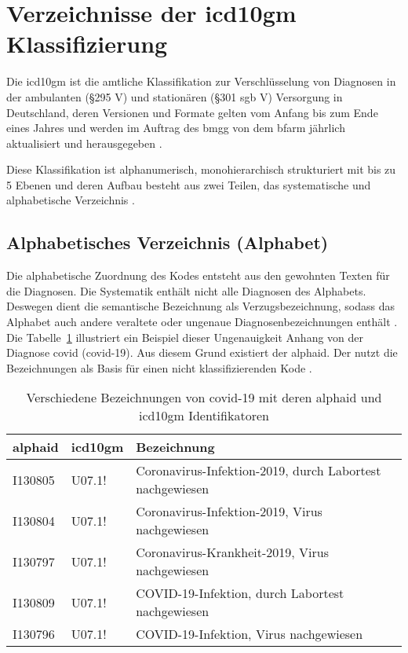 \section{Verzeichnisse der \acs{icd10gm} Klassifizierung} \label{sec:difclass}

Die \ac{icd10gm} ist die amtliche Klassifikation zur Verschlüsselung von Diagnosen in der ambulanten (\S 295  V) und stationären (\S 301 \ac{sgb} V) Versorgung in Deutschland, deren Versionen und Formate gelten vom Anfang bis zum Ende eines Jahres und werden im Auftrag des \ac{bmgg} von dem \ac{bfarm} jährlich aktualisiert und herausgegeben \cite{icd10}. 

Diese Klassifikation ist alphanumerisch, monohierarchisch strukturiert mit bis zu 5 Ebenen und deren Aufbau besteht aus zwei Teilen, das systematische und alphabetische Verzeichnis \cite{icd10}.

\subsection{Alphabetisches Verzeichnis (Alphabet)} \label{subsec:alphabetic}

Die alphabetische Zuordnung des Kodes entsteht aus den gewohnten Texten für die Diagnosen. Die Systematik enthält nicht alle Diagnosen des Alphabets. Deswegen dient die semantische Bezeichnung als Verzugsbezeichnung, sodass das Alphabet auch andere veraltete oder ungenaue Diagnosenbezeichnungen enthält \cite{icd10alpha}. Die Tabelle~\ref{tab:difbe} illustriert ein Beispiel dieser Ungenauigkeit Anhang von der Diagnose \acl{covid} (\acs{covid}-19). Aus diesem Grund existiert der \ac{alphaid}. Der nutzt die Bezeichnungen als Basis für einen nicht klassifizierenden Kode \cite{icd10alpha}.

\begin{table}[ht]
	\centering
	\small
	\caption[Verschiedene Bezeichnungen von COVID-19]{Verschiedene Bezeichnungen von \ac{covid}-19 mit deren \ac{alphaid} und \ac{icd10gm} Identifikatoren}
	\label{tab:difbe}
	\begin{tabular}{|l|l|l|}
		\hline
		\rowcolor{lightgray} \ac{alphaid} & \ac{icd10gm} & Bezeichnung \\
		\hline
		I130805 & U07.1! & Coronavirus-Infektion-2019, durch Labortest nachgewiesen \\ \hline
		I130804 & U07.1! & Coronavirus-Infektion-2019, Virus nachgewiesen \\ \hline
		I130797 & U07.1! & Coronavirus-Krankheit-2019, Virus nachgewiesen \\ \hline
		I130809 & U07.1! & COVID-19-Infektion, durch Labortest nachgewiesen \\ \hline
		I130796 & U07.1! & COVID-19-Infektion, Virus nachgewiesen \\ \hline				
	\end{tabular}
\end{table}

